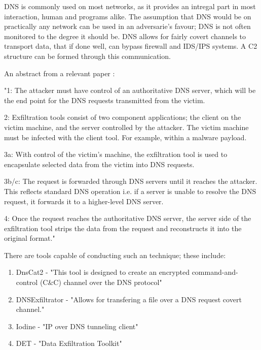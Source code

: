 DNS is commonly used on most networks, as it provides an intregal part in most interaction, human and programs alike. The assumption that DNS would be on practically any network can be used in an adversarie's favour; DNS is not often monitored to the degree it should be.
DNS allows for fairly covert channels to transport data, that if done well, can bypass firewall and IDS/IPS systems. A C2 structure can be formed through this communication.

An abstract from a relevant paper \citep{DNSExfiltration}: 

\begin{displayquote}
\begin{textit}
"1: The attacker must have control of an authoritative DNS
server, which will be the end point for the DNS requests
transmitted from the victim.

2: Exfiltration tools consist of two component applications; the client on the victim machine, and the server
controlled by the attacker. The victim machine must
be infected with the client tool. For example, within a
malware payload.

3a: With control of the victim’s machine, the exfiltration
tool is used to encapsulate selected data from the victim
into DNS requests.

3b/c: The request is forwarded through DNS servers
until it reaches the attacker. This reflects standard DNS
operation i.e. if a server is unable to resolve the DNS
request, it forwards it to a higher-level DNS server.

4: Once the request reaches the authoritative DNS server,
the server side of the exfiltration tool strips the data from
the request and reconstructs it into the original format."
\end{textit}
\end{displayquote}

\vspace*{1in}


There are tools capable of conducting such an technique; these include:
\begin{enumerate}
    \item DnsCat2 - "This tool is designed to create an encrypted command-and-control (C&C) channel over the DNS protocol" \citep{dnscat2}
    \item DNSExfiltrator - "Allows for transfering a file over a DNS request covert channel." \citep{DNSExfiltrator}
    \item Iodine - "IP over DNS tunneling client" \citep{iodine}
    \item DET - "Data Exfiltration Toolkit" \citep{DET}
\end{enumerate}

